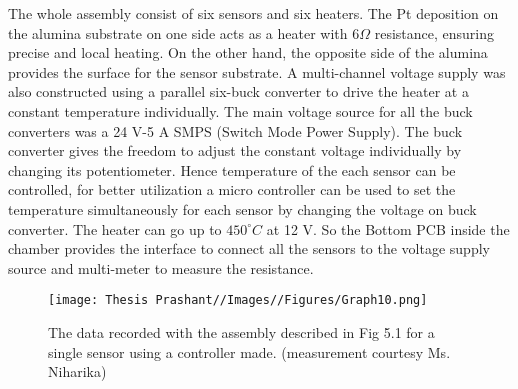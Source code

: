 The whole assembly consist of six sensors and six heaters. The Pt deposition on the alumina substrate on one side acts as a heater with $6 \Omega$ resistance, ensuring precise and local heating. On the other hand, the opposite side of the alumina provides the surface for the sensor substrate. A multi-channel voltage supply was also constructed using a parallel six-buck converter to drive the heater at a constant temperature individually. The main voltage source for all the buck converters was a 24 V-5 A SMPS (Switch Mode Power Supply). The buck converter gives the freedom to adjust the constant voltage individually by changing its potentiometer. Hence temperature of the each sensor can be controlled, for better utilization a micro controller can be used to set the temperature simultaneously for each sensor by changing the voltage on buck converter. The heater can go up to $450^\circ C$ at 12 V. So the Bottom PCB inside the chamber provides the interface to connect all the sensors to the voltage supply source and multi-meter to measure the resistance. 

\begin{figure}
    \centering
    \texttt{[image: Thesis Prashant//Images//Figures/Graph10.png]}
    \caption{The data recorded with the assembly described in Fig 5.1 for a single sensor using a controller made. (measurement courtesy Ms. Niharika)}
    \label{fig:setup}
\end{figure}



